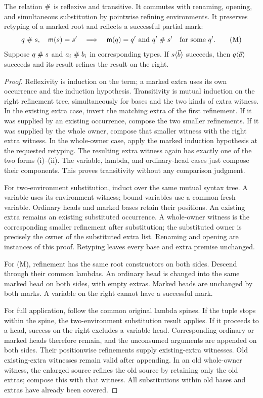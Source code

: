 \begin{lemma}\label{lem:sharp-syntax}
The relation $\mathrel{\#}$ is reflexive and transitive. It commutes
with renaming, opening, and simultaneous substitution by
pointwise refining environments. It preserves retyping of a
marked root and reflects a successful partial mark:
\[
 q\mathrel{\#} s,\quad \mathsf m(s)=s'
 \quad\Longrightarrow\quad
 \mathsf m(q)=q'\text{ and }q'\mathrel{\#} s'
 \quad\text{for some }q'.
 \tag{M}
\]
Suppose $q\mathrel{\#} s$ and $a_i\mathrel{\#} b_i$ in corresponding
types. If $s\langle \vec b\rangle$ succeeds, then $q\langle \vec a\rangle$ succeeds
and its result refines the result on the right.
\end{lemma}
\begin{proof}
Reflexivity is induction on the term; a marked extra uses its
own occurrence and the induction hypothesis. Transitivity is
mutual induction on the right refinement tree, simultaneously
for bases and the two kinds of extra witness. In the existing
extra case, invert the matching extra of the first refinement.
If it was supplied by an existing occurrence, compose the two
smaller refinements. If it was supplied by the whole owner,
compose that smaller witness with the right extra witness.
In the whole-owner case, apply the marked induction hypothesis
at the requested retyping. The resulting extra witness again
has exactly one of the two forms (i)--(ii). The variable,
lambda, and ordinary-head cases just compose their components.
This proves transitivity without any comparison judgment.

For two-environment substitution, induct over the same mutual
syntax tree. A variable uses its environment witness; bound
variables use a common fresh variable. Ordinary heads and
marked bases retain their positions. An existing extra remains
an existing substituted occurrence. A whole-owner witness is
the corresponding smaller refinement after substitution; the
substituted owner is precisely the owner of the substituted
extra list. Renaming and opening are instances of this proof.
Retyping leaves every base and extra premise unchanged.

For (M), refinement has the same root constructors on both
sides. Descend through their common lambdas. An ordinary head
is changed into the same marked head on both sides, with empty
extras. Marked heads are unchanged by both marks. A variable
on the right cannot have a successful mark.

For full application, follow the common original lambda
spines. If the tuple stops within the spine, the two-environment
substitution result applies. If it proceeds to a head, success
on the right excludes a variable head. Corresponding ordinary
or marked heads therefore remain, and the unconsumed arguments
are appended on both sides. Their positionwise refinements
supply existing-extra witnesses. Old existing-extra witnesses
remain valid after appending. In an old whole-owner witness,
the enlarged source refines the old source by retaining only
the old extras; compose this with that witness. All substitutions
within old bases and extras have already been covered.
\end{proof}

